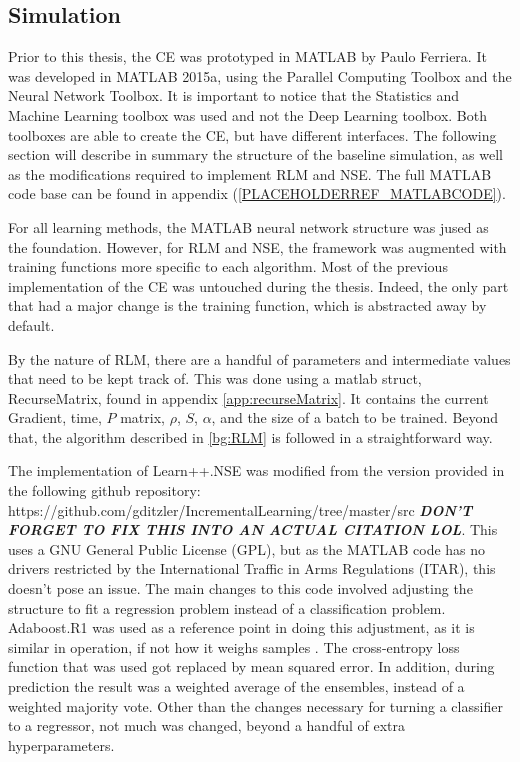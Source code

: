 \subsection{Simulation}
\par Prior to this thesis, the CE was prototyped in MATLAB by Paulo Ferriera\cite{paulo_theory_paper}. It was developed in MATLAB 2015a, using the Parallel Computing Toolbox and the Neural Network Toolbox. It is important to notice that the Statistics and Machine Learning toolbox was used and not the Deep Learning toolbox. Both toolboxes are able to create the CE, but have different interfaces. The following section will describe in summary the structure of the baseline simulation, as well as the modifications required to implement RLM and NSE. The full MATLAB code base can be found in appendix (\ref{PLACEHOLDERREF_MATLABCODE}).
\par For all learning methods, the MATLAB neural network structure was jused as the foundation. However, for RLM and NSE, the framework was augmented with training functions more specific to each algorithm. Most of the previous implementation of the CE was untouched during the thesis. Indeed, the only part that had a major change is the training function, which is abstracted away by default. 
\par By the nature of RLM, there are a handful of parameters and intermediate values that need to be kept track of. This was done using a matlab struct, RecurseMatrix, found in appendix \ref{app:recurseMatrix}. It contains the current Gradient, time, $P$ matrix, $\rho$, $S$, $\alpha$, and the size of a batch to be trained. Beyond that, the algorithm described in \ref{bg:RLM} is followed in a straightforward way.   
\par  The implementation of Learn++.NSE was modified from the version provided in the following github repository: https://github.com/gditzler/IncrementalLearning/tree/master/src \textbf{\textit{DON'T FORGET TO FIX THIS INTO AN ACTUAL CITATION LOL}}. This uses a GNU General Public License (GPL), but as the MATLAB code has no drivers restricted by the International Traffic in Arms Regulations (ITAR), this doesn't pose an issue. The main changes to this code involved adjusting the structure to fit a regression problem instead of a classification problem. Adaboost.R1 was used as a reference point in doing this adjustment, as it is similar in operation, if not how it weighs samples \cite{lol_adaboost}. The cross-entropy loss function that was used got replaced by mean squared error. In addition, during prediction the result was a weighted average of the ensembles, instead of a weighted majority vote. Other than the changes necessary for turning a classifier to a regressor, not much was changed, beyond a handful of extra hyperparameters. 


